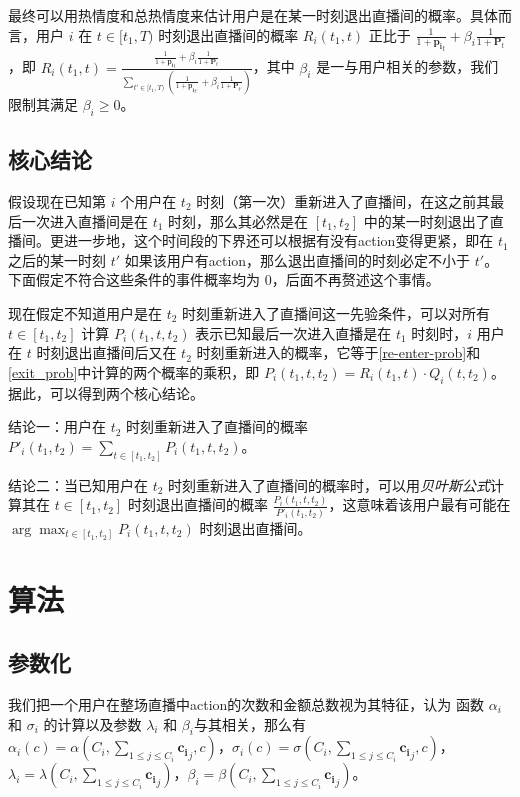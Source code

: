\documentclass{article} %
\begin{document}
最终可以用热情度和总热情度来估计用户是在某一时刻退出直播间的概率。具体而言，用户 $i$ 在 $t\in[t_1,T)$ 时刻退出直播间的概率 $R_i(t_1,t)$ 正比于 $\frac{1}{1+\mathbf{p_i}_t}+\beta_i\frac{1}{1+\mathbf{P}_t}$，即 $R_i(t_1,t)=\frac{\frac{1}{1+\mathbf{p_i}_t}+\beta_i\frac{1}{1+\mathbf{P}_t}}{\sum_{t'\in[t_1,T)}(\frac{1}{1+\mathbf{p_i}_{t'}}+\beta_i\frac{1}{1+\mathbf{P}_{t'}})}$，其中 $\beta_i$ 是一与用户相关的参数，我们限制其满足 $\beta_i\geq0$。

\subsection{核心结论}
\label{crucial}

假设现在已知第 $i$ 个用户在 $t_2$ 时刻（第一次）重新进入了直播间，在这之前其最后一次进入直播间是在 $t_1$ 时刻，那么其必然是在 $[t_1,t_2]$ 中的某一时刻退出了直播间。更进一步地，这个时间段的下界还可以根据有没有action变得更紧，即在 $t_1$ 之后的某一时刻 $t'$ 如果该用户有action，那么退出直播间的时刻必定不小于 $t'$。下面假定不符合这些条件的事件概率均为 $0$，后面不再赘述这个事情。

现在假定不知道用户是在 $t_2$ 时刻重新进入了直播间这一先验条件，可以对所有 $t \in [t_1,t_2]$ 计算 $P_i(t_1,t,t_2)$ 表示已知最后一次进入直播是在 $t_1$ 时刻时，$i$ 用户在 $t$ 时刻退出直播间后又在 $t_2$ 时刻重新进入的概率，它等于\ref{re-enter-prob}和\ref{exit_prob}中计算的两个概率的乘积，即 $P_i(t_1,t,t_2)=R_i(t_1,t)\cdot Q_i(t,t_2)$。据此，可以得到两个核心结论。

结论一：用户在 $t_2$ 时刻重新进入了直播间的概率 $P'_i(t_1,t_2)=\sum_{t\in[t_1,t_2]}P_i(t_1,t,t_2)$。

结论二：当已知用户在 $t_2$ 时刻重新进入了直播间的概率时，可以用\emph{贝叶斯公式}计算其在 $t\in[t_1,t_2]$ 时刻退出直播间的概率 $\frac{P_i(t_1,t,t_2)}{P'_i(t_1,t_2)}$，这意味着该用户最有可能在 $\arg \max_{t\in[t_1,t_2]}P_i(t_1,t,t_2)$ 时刻退出直播间。

\section{算法}
\label{headings}

\subsection{参数化}

我们把一个用户在整场直播中action的次数和金额总数视为其特征，认为 函数 $\alpha_i$ 和 $\sigma_i$ 的计算以及参数 $\lambda_i$ 和 $\beta_i$与其相关，那么有 $\alpha_i(c)=\alpha(C_i,\sum_{1\leq j \leq C_i}\mathbf{c_i}_j,c)$，$\sigma_i(c)=\sigma(C_i,\sum_{1\leq j \leq C_i}\mathbf{c_i}_j,c)$，$\lambda_i=\lambda(C_i,\sum_{1\leq j \leq C_i}\mathbf{c_i}_j)$，$\beta_i=\beta(C_i,\sum_{1\leq j \leq C_i}\mathbf{c_i}_j)$。
\end{document}
